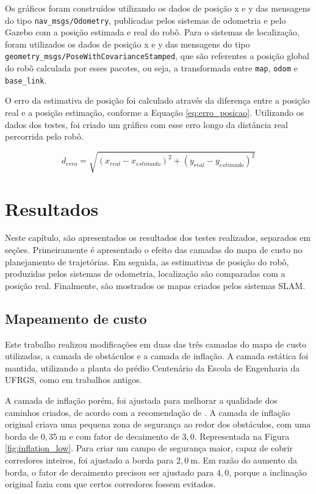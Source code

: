\documentclass[repeatfields,xlists,xpacks,oneside,yearsonly]{ufrgscca}
\begin{document}
Os gráficos foram construídos utilizando os dados de posição x e y
das mensagens do tipo \texttt{nav\_msgs/Odometry}, publicadas pelos
sistemas de odometria e pelo Gazebo com a posição estimada e real do
robô. Para o sistemas de localização, foram utilizados os dados de
posição x e y das mensagens do tipo
\texttt{geometry\_msgs/PoseWithCovarianceStamped}, que são referentes
a posição global do robô calculada por esses pacotes, ou seja, a
transformada entre \texttt{map}, \texttt{odom} e \texttt{base\_link}.

O erro da estimativa de posição foi calculado através da diferença
entre a posição real e a posição estimação, conforme a Equação
\ref{eq:erro_posicao}. Utilizando os dados dos testes, foi criado um
gráfico com esse erro longo da distância real percorrida pelo robô.

\begin{equation}
    \label{eq:erro_posicao}
    d_{erro} = \sqrt{(x_{real} - x_{estimado})^2 + (y_{real} - y_{estimado})^2}
\end{equation}

\chapter{Resultados}
\label{resultados}

Neste capítulo, são apresentados os resultados dos testes realizados,
separados em seções. Primeiramente é apresentado o efeito das camadas
do mapa de custo no planejamento de trajetórias. Em seguida, as
estimativas de posição do robô, produzidas pelos sistemas de
odometria, localização são comparadas com a posição real. Finalmente,
são mostrados os mapas criados pelos sistemas SLAM.

\section{Mapeamento de custo}

Este trabalho realizou modificações em duas das três camadas do mapa
de custo utilizadas, a camada de obstáculos e a camada de inflação. A
camada estática foi mantida, utilizando a planta do prédio Centenário
da Escola de Engenharia da UFRGS, como em trabalhos antigos.

A camada de inflação porém, foi ajustada para melhorar a qualidade
dos caminhos criados, de acordo com a recomendação de
\textcite{ros_tuning_guide}. A camada de inflação original criava uma
pequena zona de segurança ao redor dos obstáculos, com uma borda de
$0,35~\si{\meter}$ e com fator de decaimento de $3,0$. Representada
na Figura \ref{fig:inflation_low}. Para criar um campo de segurança
maior, capaz de cobrir corredores inteiros, foi ajustado a borda para
$2,0~\si{\meter}$. Em razão do aumento da borda, o fator de
decaimento precisou ser ajustado para $4,0$, porque a inclinação
original fazia com que certos corredores fossem evitados.
\end{document}
